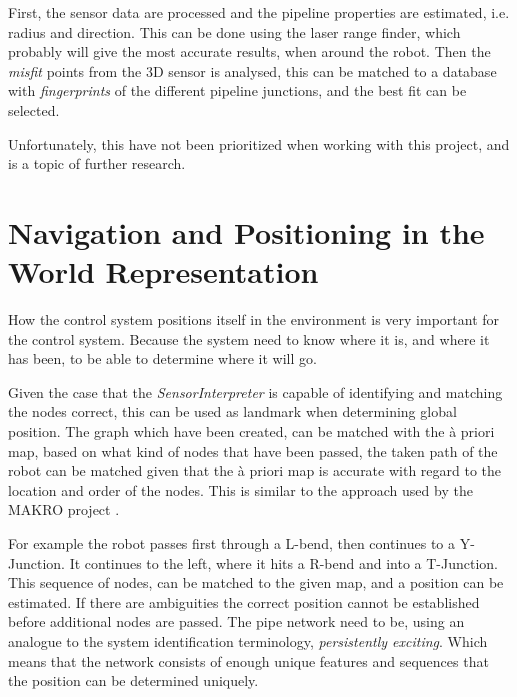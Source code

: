 First, the sensor data are processed and the pipeline properties are estimated, i.e.
radius and direction. This can be done using the laser range finder, which probably will
give the most accurate results, when around the robot. Then the \emph{misfit} points from
the 3D sensor is analysed, this can be matched to a database with \emph{fingerprints} of
the different pipeline junctions, and the best fit can be selected.

Unfortunately, this have not been prioritized when working with this project, and is a
topic of further research. 


\section{Navigation and Positioning in the World Representation}
How the control system positions itself in the environment is very important for the
control system. Because the system need to know where it is, and where it has been, to be
able to determine where it will go. 

Given the case that the \emph{SensorInterpreter} is capable of identifying and matching
the nodes correct, this can be used as landmark when determining global position. The
graph which have been created, can be matched with the \`a priori map, based on what kind
of nodes that have been passed, the taken path of the robot can be matched given that the
\`a priori map is accurate with regard to the location and order of the nodes. This is
similar to the approach used by the MAKRO project \cite{makro-visual}.

For example the robot passes first through a L-bend, then continues to a Y-Junction. It
continues to the left, where it hits a R-bend and into a T-Junction. This sequence of
nodes, can be matched to the given map, and a position can be estimated. If there are
ambiguities the correct position cannot be established before additional nodes are passed.
The pipe network need to be, using an analogue to the system identification terminology, 
\emph{persistently exciting}. Which means that the network consists of enough unique features and
sequences that the position can be determined uniquely. 

